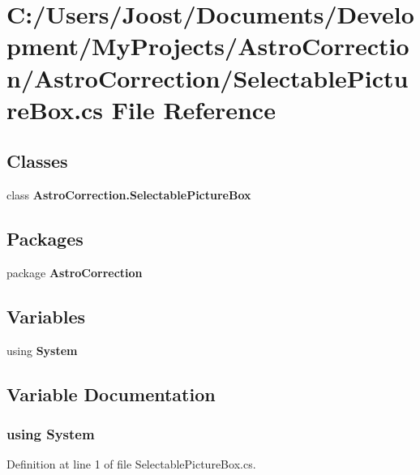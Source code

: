 \section{C:/Users/Joost/Documents/Development/MyProjects/AstroCorrection/AstroCorrection/SelectablePictureBox.cs File Reference}
\label{_selectable_picture_box_8cs}
\subsection*{Classes}
\begin{DoxyCompactItemize}
\item 
class {\bf AstroCorrection.SelectablePictureBox}
\end{DoxyCompactItemize}
\subsection*{Packages}
\begin{DoxyCompactItemize}
\item 
package {\bf AstroCorrection}
\end{DoxyCompactItemize}
\subsection*{Variables}
\begin{DoxyCompactItemize}
\item 
﻿using {\bf System}
\end{DoxyCompactItemize}


\subsection{Variable Documentation}
\subsubsection[{System}]{\setlength{\rightskip}{0pt plus 5cm}﻿using {\bf System}}\label{_selectable_picture_box_8cs_a81a223a02c34d82b47199f08308847f2}


Definition at line 1 of file SelectablePictureBox.cs.